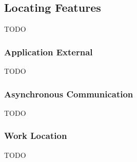 \subsection{Locating Features} %
TODO
\subsubsection{Application External} %
TODO
\subsubsection{Asynchronous Communication} %
TODO
\subsubsection{Work Location} %
TODO


